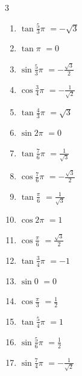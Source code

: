 \begin{multicols}{3}
\begin{enumerate}
  \item $\displaystyle \tan{\frac{5}{3}\pi}$
        $\displaystyle =-\sqrt{3}$

  \item $\displaystyle \tan{\pi}$
        $\displaystyle =0$

  \item $\displaystyle \sin{\frac{5}{3}\pi}$
        $\displaystyle =-\frac{\sqrt{3}}{2}$

  \item $\displaystyle \cos{\frac{3}{4}\pi}$
        $\displaystyle =-\frac{1}{\sqrt{2}}$

  \item $\displaystyle \tan{\frac{4}{3}\pi}$
        $\displaystyle =\sqrt{3}$

  \item $\displaystyle \sin{2\pi}$
        $\displaystyle =0$

  \item $\displaystyle \tan{\frac{7}{6}\pi}$
        $\displaystyle =\frac{1}{\sqrt{3}}$

  \item $\displaystyle \cos{\frac{7}{6}\pi}$
        $\displaystyle =-\frac{\sqrt{3}}{2}$

  \item $\displaystyle \tan{\frac{\pi}{6}}$
        $\displaystyle =\frac{1}{\sqrt{3}}$

  \item $\displaystyle \cos{2\pi}$
        $\displaystyle =1$

  \item $\displaystyle \cos{\frac{\pi}{6}}$
        $\displaystyle =\frac{\sqrt{3}}{2}$

  \item $\displaystyle \tan{\frac{3}{4}\pi}$
        $\displaystyle =-1$

  \item $\displaystyle \sin{0}$
        $\displaystyle =0$

  \item $\displaystyle \cos{\frac{\pi}{3}}$
        $\displaystyle =\frac{1}{2}$

  \item $\displaystyle \tan{\frac{5}{4}\pi}$
        $\displaystyle =1$

  \item $\displaystyle \sin{\frac{5}{6}\pi}$
        $\displaystyle =\frac{1}{2}$

  \item $\displaystyle \sin{\frac{7}{4}\pi}$
        $\displaystyle =-\frac{1}{\sqrt{2}}$


\end{enumerate}
\end{multicols}
